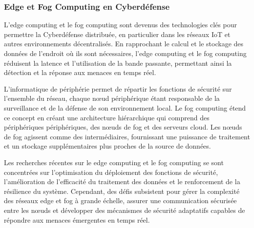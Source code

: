 \subsubsection{Edge et Fog Computing en Cyberdéfense}

L'edge computing et le fog computing sont devenus des technologies clés pour permettre la Cyberdéfense distribuée, en particulier dans les réseaux IoT et autres environnements décentralisés. En rapprochant le calcul et le stockage des données de l'endroit où ils sont nécessaires, l'edge computing et le fog computing réduisent la latence et l'utilisation de la bande passante, permettant ainsi la détection et la réponse aux menaces en temps réel.

L'informatique de périphérie permet de répartir les fonctions de sécurité sur l'ensemble du réseau, chaque nœud périphérique étant responsable de la surveillance et de la défense de son environnement local. Le fog computing étend ce concept en créant une architecture hiérarchique qui comprend des périphériques périphériques, des nœuds de fog et des serveurs cloud. Les nœuds de fog agissent comme des intermédiaires, fournissant une puissance de traitement et un stockage supplémentaires plus proches de la source de données.

Les recherches récentes sur le edge computing et le fog computing se sont concentrées sur l'optimisation du déploiement des fonctions de sécurité, l'amélioration de l'efficacité du traitement des données et le renforcement de la résilience du système. Cependant, des défis subsistent pour gérer la complexité des réseaux edge et fog à grande échelle, assurer une communication sécurisée entre les nœuds et développer des mécanismes de sécurité adaptatifs capables de répondre aux menaces émergentes en temps réel.



